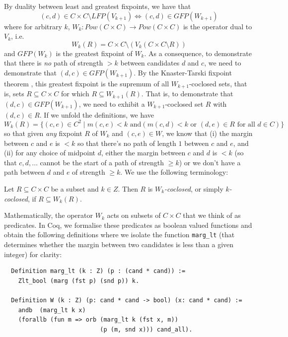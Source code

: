 By duality between least and greatest fixpoints, we have that \[
(c, d) \in C \times C
\setminus LFP(V_{k+1}) \iff (c,d) \in GFP(W_{k+1}) \]
where for arbitrary $k$, $W_k: Pow(C \times C) \to Pow(C \times C)$ is the operator dual
to $V_k$, i.e.
\[ W_k(R) = C \times C \setminus (V_k (C\times C \setminus R)) \]
and $GFP(W_k)$ is the greatest fixpoint of $W_k$.
As a consequence, to demonstrate that there is \emph{no} path of
strength $> k$ between candidates $d$ and $c$, we need to
demonstrate that $(d, c) \in GFP(W_{k+1})$. By the Knaster-Tarski fixpoint
theorem \citep{Tarski:1955:LTF}, this greatest fixpoint is the supremum of all
$W_{k+1}$-coclosed sets, that is, sets $R \subseteq C \times C$ for which
$R \subseteq W_{k+1}(R)$.
That is, to demonstrate that $(d, c) \in GFP(W_{k+1})$, we need
to exhibit a $W_{k+1}$-coclosed set $R$ with $(d, c) \in R$.
If we unfold the definitions, we have
\[ W_k(R) = \lbrace (c, e) \in C^2 \mid m(c, e) < k \mbox{ and
} (m(c, d) < k \mbox{ or } (d,e) \in R \mbox{ for all } d \in C)
\rbrace \]
so that given \emph{any} fixpoint $R$ of $W_k$ and $(c, e) \in W$, we
know that (i) the margin between $c$ and $e$ is $< k$ so that
there's no path of length $1$ between $c$ and $e$, and (ii) for any
choice of midpoint $d$, either the margin between $c$ and $d$ is $<
k$ (so that $c, d, \dots$ cannot be the start of a path of strength
$\geq k$) or we don't have a path between $d$ and $e$ of strength
$\geq k$. We use the following terminology:

\begin{definition} Let $R \subseteq C \times C$ be a subset and $k \in
Z$. Then $R$ is \emph{$W_k$-coclosed}, or simply
\emph{$k$-coclosed}, if $R \subseteq W_k(R)$.
\end{definition}

\noindent
Mathematically, the operator $W_k$ acts on subsets of $C \times C$
that we think of as predicates. In Coq, we formalise these
predicates as boolean valued functions and obtain the following
definitions where we isolate the function \texttt{marg\_lt} (that
determines whether the margin between two candidates is less than a
given integer) for clarity:

\begin{verbatim}
  Definition marg_lt (k : Z) (p : (cand * cand)) :=
    Zlt_bool (marg (fst p) (snd p)) k.

  Definition W (k : Z) (p: cand * cand -> bool) (x: cand * cand) :=
    andb  (marg_lt k x)
    (forallb (fun m => orb (marg_lt k (fst x, m)) 
                           (p (m, snd x))) cand_all).
\end{verbatim}


